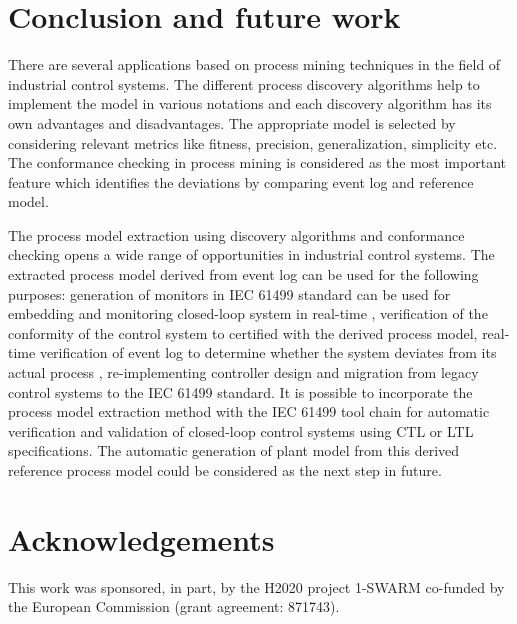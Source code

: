 \documentclass[conference]{IEEEtran}
\begin{document}
\section{Conclusion and future work}
\label{sec:conclusion}
There are several applications based on process mining techniques in the field of industrial control systems. The different process discovery algorithms help to implement the model in various notations and each discovery algorithm has its own advantages and disadvantages. The appropriate model is selected by considering relevant metrics like fitness, precision, generalization, simplicity etc. The conformance checking in process mining is considered as the most important feature which identifies the deviations by comparing event log and reference model.

The process model extraction using discovery algorithms and conformance checking opens a wide range of opportunities in industrial control systems. The extracted process model derived from event log can be used for the following purposes: generation of monitors in IEC 61499 standard can be used for embedding and monitoring closed-loop system in real-time \cite{wenger2015behavioral}, verification of the conformity of the control system to certified with the derived process model, real-time verification of event log to determine whether the system deviates from its actual process , re-implementing controller design and migration from legacy control systems to the IEC 61499 standard. It is possible to incorporate the process model extraction method with the IEC 61499 tool chain \cite{xavier2021cyber} for automatic verification and validation of closed-loop control systems using CTL or LTL specifications. 
The automatic generation of plant model  from this derived reference process model could be considered as the next step in future.

\section{Acknowledgements}
This work was sponsored, in part, by the H2020 project 1-SWARM co-funded by the European Commission (grant agreement: 871743).  



\end{document}
